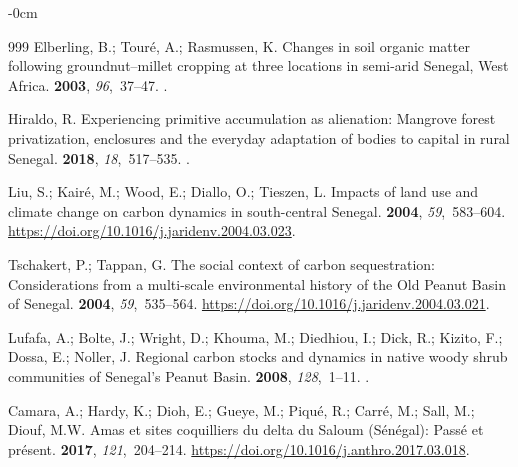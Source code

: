 \documentclass[earth,article,accept,pdftex,moreauthors]{Definitions/mdpi}
\begin{document}
{\begin{adjustwidth}{-\extralength}{0cm}
\begin{thebibliography}{999}
Elberling, B.; Touré, A.; Rasmussen, K.
\newblock Changes in soil organic matter following groundnut–millet cropping
  at three locations in semi-arid Senegal, West Africa.
 {\bf 2003}, {\em
  96},~37--47.
.

Hiraldo, R.
\newblock Experiencing primitive accumulation as alienation: Mangrove forest
  privatization, enclosures and the everyday adaptation of bodies to capital in
  rural Senegal.
 {\bf 2018}, {\em 18},~517--535.
.

Liu, S.; Kairé, M.; Wood, E.; Diallo, O.; Tieszen, L.
\newblock Impacts of land use and climate change on carbon dynamics in
  south-central Senegal.
 {\bf 2004}, {\em 59},~583--604. %
  {\url{https://doi.org/10.1016/j.jaridenv.2004.03.023}}.

Tschakert, P.; Tappan, G.
\newblock The social context of carbon sequestration: Considerations from a
  multi-scale environmental history of the Old Peanut Basin of Senegal.
 {\bf 2004}, {\em 59},~535--564. %
  {\url{https://doi.org/10.1016/j.jaridenv.2004.03.021}}.

Lufafa, A.; Bolte, J.; Wright, D.; Khouma, M.; Diedhiou, I.; Dick, R.; Kizito,
  F.; Dossa, E.; Noller, J.
\newblock Regional carbon stocks and dynamics in native woody shrub communities
  of Senegal's Peanut Basin.
 {\bf 2008}, {\em
  128},~1--11.
.

Camara, A.; Hardy, K.; Dioh, E.; Gueye, M.; Piqué, R.; Carré, M.; Sall, M.;
  Diouf, M.W.
\newblock Amas et sites coquilliers du delta du Saloum (Sénégal): Passé et
  présent.
 {\bf 2017}, {\em 121},~204--214. %
  {\url{https://doi.org/10.1016/j.anthro.2017.03.018}}.


\end{thebibliography}
\end{adjustwidth}}
\end{document}
